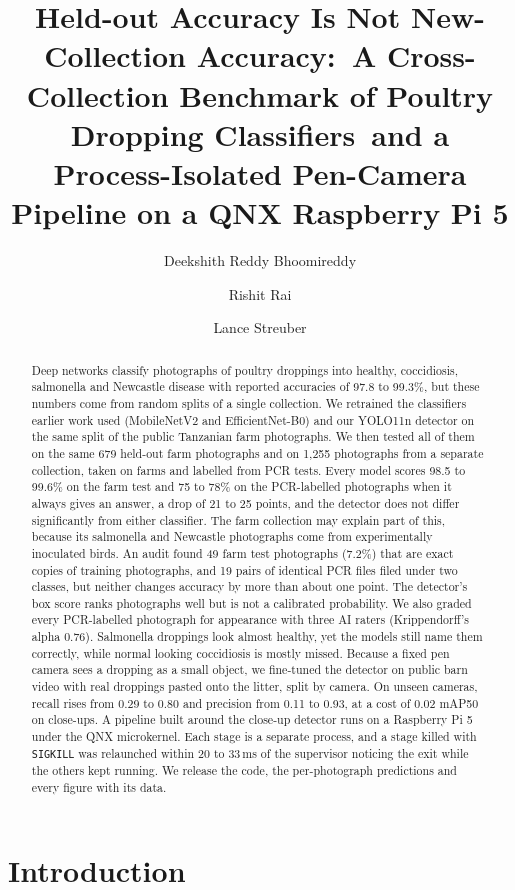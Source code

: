 \documentclass[10pt,twocolumn]{article}
\title{Held-out Accuracy Is Not New-Collection Accuracy:\
A Cross-Collection Benchmark of Poultry Dropping Classifiers\
and a Process-Isolated Pen-Camera Pipeline on a QNX Raspberry Pi 5}
\author{Deekshith Reddy Bhoomireddy \and Rishit Rai \and Lance Streuber}
\date{}
\begin{document}
\maketitle

\begin{abstract}
Deep networks classify photographs of poultry droppings into healthy, coccidiosis, salmonella and Newcastle disease
with reported accuracies of 97.8 to 99.3\%, but these numbers come from random splits of a single collection. We
retrained the classifiers earlier work used (MobileNetV2 and EfficientNet-B0) and our YOLO11n detector on the same
split of the public Tanzanian farm photographs. We then tested all of them on the same 679 held-out farm photographs
and on 1,255 photographs from a separate collection, taken on farms and labelled from PCR tests. Every model scores
98.5 to 99.6\% on the farm test and 75 to 78\% on the PCR-labelled photographs when it always gives an answer, a drop
of 21 to 25 points, and the detector does not differ significantly from either classifier. The farm collection may
explain part of this, because its salmonella and Newcastle photographs come from experimentally inoculated birds. An
audit found 49 farm test photographs (7.2\%) that are exact copies of training photographs, and 19 pairs of identical
PCR files filed under two classes, but neither changes accuracy by more than about one point. The detector's box
score ranks photographs well but is not a calibrated probability. We also graded every PCR-labelled photograph for
appearance with three AI raters (Krippendorff's alpha 0.76). Salmonella droppings look almost healthy, yet the
models still name them correctly, while normal looking coccidiosis is mostly missed. Because a fixed pen camera sees
a dropping as a small object, we fine-tuned the detector on public barn video with real droppings pasted onto the
litter, split by camera. On unseen cameras, recall rises from 0.29 to 0.80 and precision from 0.11 to 0.93, at a cost
of 0.02 mAP50 on close-ups. A pipeline built around the close-up detector runs on a Raspberry Pi 5 under the QNX
microkernel. Each stage is a separate process, and a stage killed with \texttt{SIGKILL} was relaunched within 20 to
33\,ms of the supervisor noticing the exit while the others kept running. We release the code, the per-photograph
predictions and every figure with its data.
\end{abstract}

\section{Introduction}
\label{sec:intro}
\end{document}
